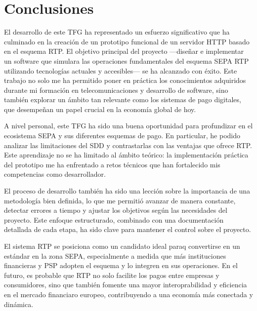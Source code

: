\chapter{Conclusiones}
\label{sec:Conclusiones}

El desarrollo de este TFG ha representado un esfuerzo significativo que ha culminado en la creación de un prototipo funcional de un servidor HTTP basado en el esquema RTP. El objetivo principal del proyecto —diseñar e implementar un software que simulara las operaciones fundamentales del esquema SEPA RTP utilizando tecnologías actuales y accesibles— se ha alcanzado con éxito. Este trabajo no solo me ha permitido poner en práctica los conocimientos adquiridos durante mi formación en telecomunicaciones y desarrollo de software, sino también explorar un ámbito tan relevante como los sistemas de pago digitales, que desempeñan un papel crucial en la economía global de hoy.

\vspace{0.5cm}

A nivel personal, este TFG ha sido una buena oportunidad para profundizar en el ecosistema SEPA y sus diferentes esquemas de pago. En particular, he podido analizar las limitaciones del SDD y contrastarlas con las ventajas que ofrece RTP. Este aprendizaje no se ha limitado al ámbito teórico: la implementación práctica del prototipo me ha enfrentado a retos técnicos que han fortalecido mis competencias como desarrollador.

\vspace{0.5cm}

El proceso de desarrollo también ha sido una lección sobre la importancia de una metodología bien definida, lo que me permitió avanzar de manera constante, detectar errores a tiempo y ajustar los objetivos según las necesidades del proyecto. Este enfoque estructurado, combinado con una documentación detallada de cada etapa, ha sido clave para mantener el control sobre el proyecto.
\vspace{0.5cm}


El sistema RTP se posiciona como un candidato ideal paraq convertirse en un estándar en la zona SEPA, especialmente a medida que más instituciones financieras y PSP adopten el esquema y lo integren en sus operaciones. En el futuro, es probable que RTP no solo facilite los pagos entre empresas y consumidores, sino que también fomente una mayor interoprabilidad y eficiencia en el mercado financiaro europeo, contribuyendo a una economía más conectada y dinámica.
\vspace{0.5cm}


